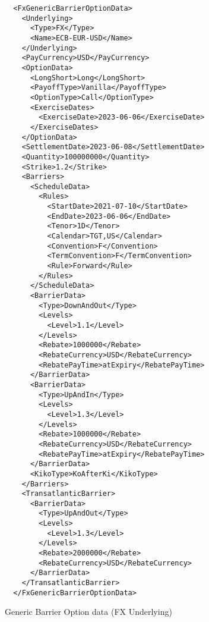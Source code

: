 \begin{listing}[H]
\begin{verbatim}
  <FxGenericBarrierOptionData>
    <Underlying>
      <Type>FX</Type>
      <Name>ECB-EUR-USD</Name>
    </Underlying>
    <PayCurrency>USD</PayCurrency>
    <OptionData>
      <LongShort>Long</LongShort>
      <PayoffType>Vanilla</PayoffType>
      <OptionType>Call</OptionType>
      <ExerciseDates>
        <ExerciseDate>2023-06-06</ExerciseDate>
      </ExerciseDates>
    </OptionData>
    <SettlementDate>2023-06-08</SettlementDate>
    <Quantity>100000000</Quantity>
    <Strike>1.2</Strike>
    <Barriers>
      <ScheduleData>
        <Rules>
          <StartDate>2021-07-10</StartDate>
          <EndDate>2023-06-06</EndDate>
          <Tenor>1D</Tenor>
          <Calendar>TGT,US</Calendar>
          <Convention>F</Convention>
          <TermConvention>F</TermConvention>
          <Rule>Forward</Rule>
        </Rules>
      </ScheduleData>
      <BarrierData>
        <Type>DownAndOut</Type>
        <Levels>
          <Level>1.1</Level>
        </Levels>
        <Rebate>1000000</Rebate>
        <RebateCurrency>USD</RebateCurrency>
        <RebatePayTime>atExpiry</RebatePayTime>
      </BarrierData>
      <BarrierData>
        <Type>UpAndIn</Type>
        <Levels>
          <Level>1.3</Level>
        </Levels>
        <Rebate>1000000</Rebate>
        <RebateCurrency>USD</RebateCurrency>
        <RebatePayTime>atExpiry</RebatePayTime>
      </BarrierData>
      <KikoType>KoAfterKi</KikoType>
    </Barriers>
    <TransatlanticBarrier>
      <BarrierData>
        <Type>UpAndOut</Type>
        <Levels>
          <Level>1.3</Level>
        </Levels>
        <Rebate>2000000</Rebate>
        <RebateCurrency>USD</RebateCurrency>
      </BarrierData>
    </TransatlanticBarrier>
  </FxGenericBarrierOptionData>
\end{verbatim}
\caption{Generic Barrier Option data (FX Underlying)}
\label{lst:generic_barrieroption_data}
\end{listing}

